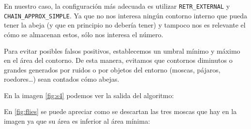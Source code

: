 En nuestro caso, la configuración más adecuada es utilizar
\texttt{RETR\_EXTERNAL} y \texttt{CHAIN\_APPROX\_SIMPLE}. Ya que no nos
interesa ningún contorno interno que pueda tener la abeja (y que en
principio no debería tener) y tampoco nos es relevante el cómo se
almacenan estos, sólo nos interesa el número.

Para evitar posibles falsos positivos, establecemos un umbral mínimo y
máximo en el área del contorno. De esta manera, evitamos que contornos
diminutos o grandes generados por ruidos o por objetos del entorno
(moscas, pájaros, roedores\ldots{}) sean contados cómo abejas.

En la imagen \ref{fig:s4} podemos ver la salida del algoritmo:


En \ref{fig:flies} se puede apreciar como se descartan las tres moscas que hay
en la imagen ya que su área es inferior al área mínima:

